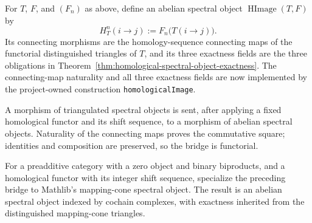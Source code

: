 \begin{definition}
  \label{def:homological-image-abelian-spectral-object}
  \leanok
  For $T$, $F$, and $(F_n)$ as above, define an abelian spectral object
  $\operatorname{HImage}(T,F)$ by
  \[
    H^n_T(i\to j):=F_n\bigl(T(i\to j)\bigr).
  \]
  Its connecting morphisms are the homology-sequence connecting maps of the
  functorial distinguished triangles of $T$, and its three exactness fields are
  the three obligations in
  Theorem~\ref{thm:homological-spectral-object-exactness}.  The connecting-map
  naturality and all three exactness fields are now implemented by the
  project-owned construction \texttt{homologicalImage}.
\end{definition}

\begin{definition}
  \label{def:homological-image-functoriality}
  \leanok
  A morphism of triangulated spectral objects is sent, after applying a fixed
  homological functor and its shift sequence, to a morphism of abelian spectral
  objects.  Naturality of the connecting maps proves the commutative square;
  identities and composition are preserved, so the bridge is functorial.
\end{definition}

\begin{definition}
  \label{def:mapping-cone-homological-image}
  \leanok
  For a preadditive category with a zero object and binary biproducts, and a
  homological functor with its integer shift sequence, specialize the preceding
  bridge to Mathlib's mapping-cone spectral object.  The result is an abelian
  spectral object indexed by cochain complexes, with exactness inherited from
  the distinguished mapping-cone triangles.
\end{definition}

